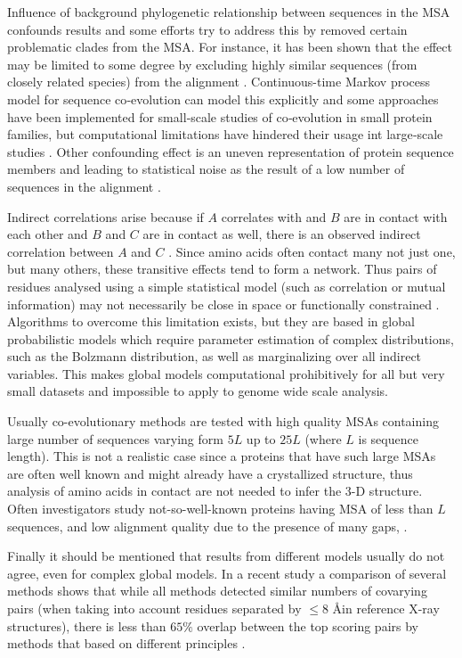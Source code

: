Influence of background phylogenetic relationship between sequences in the MSA confounds results and some efforts try to address this by 
removed certain problematic clades from the MSA.
For instance, it has been shown that the effect may be limited to some degree by excluding highly similar sequences (from closely related species) from the alignment \cite{dunn2008mutual:REF (Wollenberg and Atchley, 2000), (Martin et al., 2005; Tillier and Lui, 2003)}.
Continuous-time Markov process model for sequence co‐evolution can model this explicitly and some approaches have been implemented for small‐scale studies of co‐evolution in small protein families, but computational limitations have hindered their usage int large‐scale studies \cite{de2013emerging}.
Other confounding effect is an uneven representation of protein sequence members and leading to statistical noise as the result of a low number of sequences in the alignment \cite{marks2012protein}.

Indirect correlations arise because 	if $A$ correlates with and $B$ are in contact with each other and $B$ and $C$ are in contact as well, there is an observed indirect correlation between $A$ and $C$ \cite{marks2012protein}.
Since amino acids often contact many not just one, but many others, these transitive effects tend to form a network.
Thus pairs of residues analysed using a simple statistical model (such as correlation or mutual information) may not necessarily be close in space or functionally constrained \cite{marks2012protein}.
Algorithms to overcome this limitation exists, but they are based in global probabilistic models which require parameter estimation of complex distributions, such as the Bolzmann distribution, as well as marginalizing over all indirect variables.
This makes global models computational prohibitively for all but very small datasets and impossible to apply to genome wide scale analysis.

Usually co-evolutionary methods are tested with high quality MSAs containing large number of sequences varying form $5L$ up to $25L$ (where $L$ is  sequence length).
This is not a realistic case since a proteins that have such large MSAs are often well known and might already have a crystallized structure, thus analysis of amino acids in contact are not needed to infer the 3-D structure.
Often investigators study not-so-well-known proteins having MSA of less than $L$ sequences, and low alignment quality due to the presence of many gaps, \cite{clark2014multidimensional}.

Finally it should be mentioned that results from different models usually do not agree, even for complex global models.
In a recent study a comparison of several methods shows that while all methods detected similar numbers of covarying pairs (when taking into account residues separated by $\le 8$ \AA in reference X-ray structures), there is less than $65\%$ overlap between the top scoring pairs by methods that based on different principles \cite{clark2014multidimensional}.
